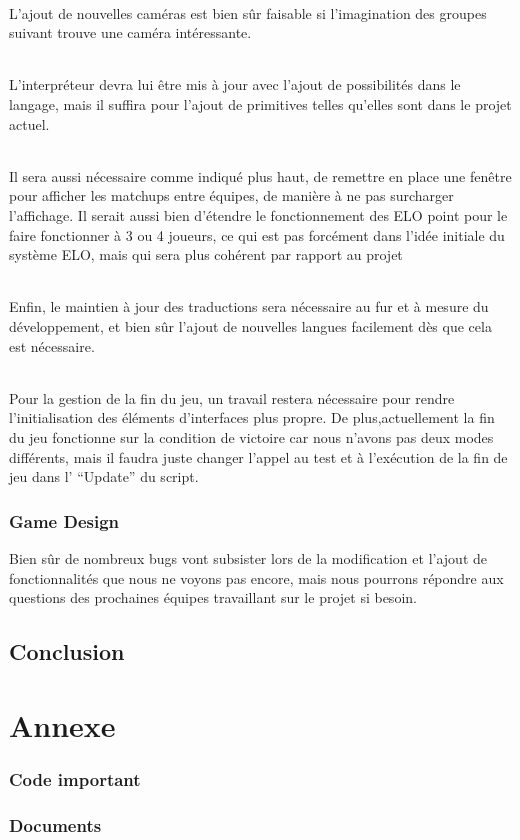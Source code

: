 \documentclass{report}
\begin{document}
\paragraph{}
L’ajout de nouvelles caméras est bien sûr faisable si l’imagination des groupes suivant trouve une caméra intéressante. 
\paragraph{}
L’interpréteur devra lui être mis à jour avec l’ajout de possibilités dans le langage, mais il suffira pour l’ajout de primitives telles qu’elles sont dans le projet actuel.
\paragraph{}
Il sera aussi nécessaire comme indiqué plus haut, de remettre en place une fenêtre pour afficher les matchups entre équipes, de manière à ne pas surcharger l’affichage. Il serait aussi bien d’étendre le fonctionnement des ELO point pour le faire fonctionner à 3 ou 4 joueurs, ce qui est pas forcément dans l’idée initiale du système ELO, mais qui sera plus cohérent par rapport au projet
\paragraph{}
Enfin, le maintien à jour des traductions sera nécessaire au fur et à mesure du développement, et bien sûr l’ajout de nouvelles langues facilement dès que cela est nécessaire.
\paragraph{}
Pour la gestion de la fin du jeu, un travail restera nécessaire pour rendre l’initialisation des éléments d’interfaces plus propre. De plus,actuellement la fin du jeu fonctionne sur la condition de victoire car nous n’avons pas deux modes différents, mais il faudra juste changer l’appel au test et à l'exécution de la fin de jeu dans l’ “Update” du script.

\section{Game Design}

Bien sûr de nombreux bugs vont subsister lors de la modification et l’ajout de fonctionnalités que nous ne voyons pas encore, mais nous pourrons répondre aux questions des prochaines équipes travaillant sur le projet si besoin.

\chapter{Conclusion}

\part{Annexe}
\section{Code important}

\section{Documents}
%
%
\end{document}
